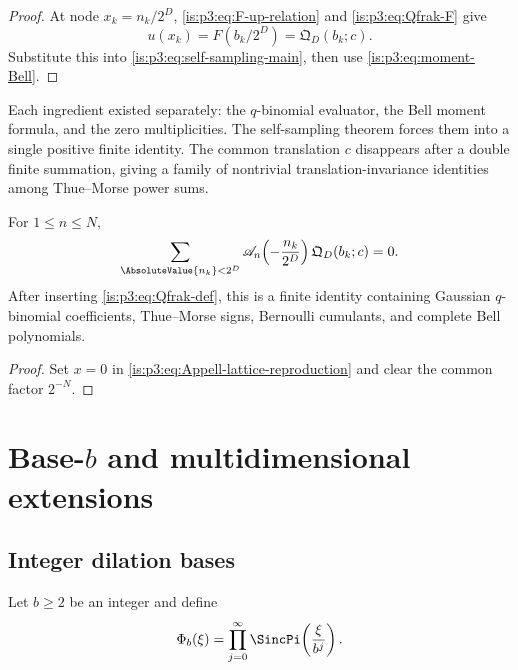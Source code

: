 \begin{proof}
At node $x_k=n_k/2^D$, \eqref{is:p3:eq:F-up-relation} and \eqref{is:p3:eq:Qfrak-F} give
\[
 u(x_k)=F(b_k/2^D)=\mathfrak Q_D(b_k;c).
\]
Substitute this into \eqref{is:p3:eq:self-sampling-main}, then use \eqref{is:p3:eq:moment-Bell}.
\end{proof}

\begin{remark}
Each ingredient existed separately: the $q$-binomial evaluator, the Bell moment formula, and the zero multiplicities.  The self-sampling theorem forces them into a single positive finite identity.  The common translation $c$ disappears after a double finite summation, giving a family of nontrivial translation-invariance identities among Thue--Morse power sums.
\end{remark}

\begin{corollary}
\label{is:p3:cor:q-Appell-cancellation}
For $1\le n\le N$,
\begin{equation}
 \sum_{\AbsoluteValue{n_k}<2^D}
 \Acal_n\!\left(-\frac{n_k}{2^D}\right)
 \mathfrak Q_D(b_k;c)=0.
 \label{is:p3:eq:q-Appell-cancellation}
\end{equation}
After inserting \eqref{is:p3:eq:Qfrak-def}, this is a finite identity containing Gaussian $q$-binomial coefficients, Thue--Morse signs, Bernoulli cumulants, and complete Bell polynomials.
\end{corollary}

\begin{proof}
Set $x=0$ in \eqref{is:p3:eq:Appell-lattice-reproduction} and clear the common factor $2^{-N}$.
\end{proof}

\section{Base-\texorpdfstring{$b$}{b} and multidimensional extensions}
\label{is:p3:sec:extensions}

\subsection{Integer dilation bases}

Let $b\ge2$ be an integer and define
\begin{equation}
 \Phi_b(\xi)=\prod_{j=0}^{\infty}
 \SincPi\!\left(\frac{\xi}{b^j}\right).
 \label{is:p3:eq:Phi-b}
\end{equation}

